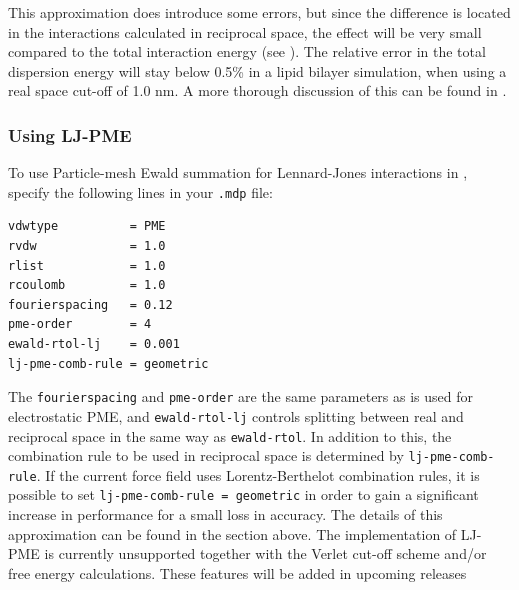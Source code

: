 This approximation does introduce some errors, but since the
difference is located in the interactions calculated in reciprocal
space, the effect will be very small compared to the total interaction
energy (see ). The relative error in
the total dispersion energy will stay below 0.5\% in a lipid bilayer
simulation, when using a real space cut-off of 1.0 nm. A more
thorough discussion of this can be found in \cite{Wennberg13}.

\subsubsection{Using LJ-PME}
To use Particle-mesh Ewald summation for Lennard-Jones interactions in {\gromacs}, specify the
following lines in your {\tt .mdp} file:
\begin{verbatim}
vdwtype          = PME
rvdw             = 1.0
rlist            = 1.0
rcoulomb         = 1.0
fourierspacing   = 0.12
pme-order        = 4
ewald-rtol-lj    = 0.001
lj-pme-comb-rule = geometric
\end{verbatim}

The {\tt fourierspacing} and {\tt pme-order} are the same parameters
as is used for electrostatic PME, and {\tt ewald-rtol-lj} controls
splitting between real and reciprocal space in the same way as
{\tt ewald-rtol}.  In addition to this, the combination rule to be used
in reciprocal space is determined by {\tt lj-pme-comb-rule}. If the
current force field uses Lorentz-Berthelot combination rules, it is
possible to set {\tt lj-pme-comb-rule = geometric} in order to gain a
significant increase in performance for a small loss in accuracy. The
details of this approximation can be found in the section above.  The
implementation of LJ-PME is currently unsupported together with the
Verlet cut-off scheme and/or free energy calculations. These features
will be added in upcoming releases

